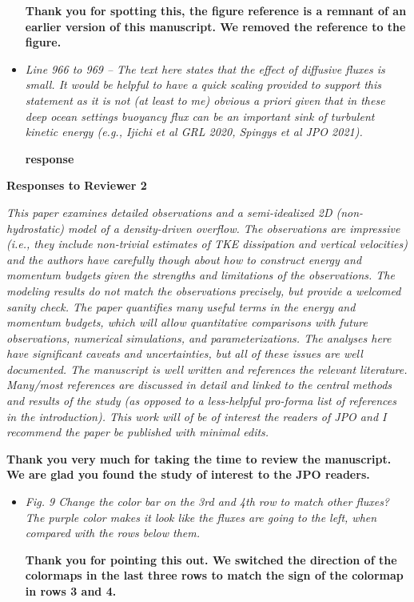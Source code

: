 \documentclass[11pt]{article}
\begin{document}
\begin{flushleft}
\begin{itemize}
\bf
Thank you for spotting this, the figure reference is a remnant of an earlier version of this manuscript. We removed the reference to the figure.

\item \it
Line 966 to 969 -- The text here states that the effect of diffusive fluxes is small. It would be helpful to have a quick scaling provided to support this statement as it is not (at least to me) obvious a priori given that in these deep ocean settings buoyancy flux can be an important sink of turbulent kinetic energy (e.g., Ijichi et al GRL 2020, Spingys et al JPO 2021).

\bf
response

\end{itemize}


\clearpage

\centerline{\bf Responses to Reviewer 2}
\vspace{0.05in}

\it 
This paper examines detailed observations and a semi-idealized 2D (non-hydrostatic) model of a density-driven overflow. The observations are impressive (i.e., they include non-trivial estimates of TKE dissipation and vertical velocities) and the authors have carefully though about how to construct energy and momentum budgets given the strengths and limitations of the observations. The modeling results do not match the observations precisely, but provide a welcomed sanity check. The paper quantifies many useful terms in the energy and momentum budgets, which will allow quantitative comparisons with future observations, numerical simulations, and parameterizations. The analyses here have significant caveats and uncertainties, but all of these issues are well documented. The manuscript is well written and references the relevant literature. Many/most references are discussed in detail and linked to the central methods and results of the study (as opposed to a less-helpful pro-forma list of references in the introduction). This work will of be of interest the readers of JPO and I recommend the paper be published with minimal edits.
\vspace{0.05in}

\bf
Thank you very much for taking the time to review the manuscript. We are glad you found the study of interest to the JPO readers.


\begin{itemize}

\item \it
Fig. 9 Change the color bar on the 3rd and 4th row to match other fluxes? The purple color makes it look like the fluxes are going to the left, when compared with the rows below them.

\bf
Thank you for pointing this out. We switched the direction of the colormaps in the last three rows to match the sign of the colormap in rows 3 and 4.

\end{itemize}

\clearpage

\end{flushleft}
\end{document}
